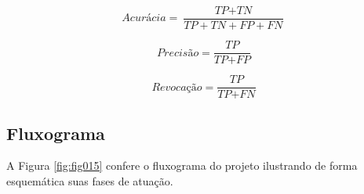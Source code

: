 \begin{equation}
\textit{Acurácia} = \frac{\textit{TP} + \textit{TN}}{\textit{TP} + \textit{TN} + \textit{FP} + \textit{FN}}
\label{eq:acc}
\end{equation}

\begin{equation}
\textit{Precisão} = \frac{\textit{TP}}{\textit{TP} + \textit{FP}}
\label{eq:precision}
\end{equation}

\begin{equation}
\textit{Revocação} = \frac{\textit{TP}}{\textit{TP} + \textit{FN}}
\label{eq:recall}
\end{equation}



\subsection{Fluxograma}
\label{subsec:cap4_floxugrama}

A Figura \ref{fig:fig015} confere o fluxograma do projeto ilustrando de forma esquemática suas fases de atuação.



